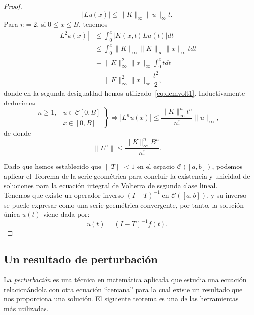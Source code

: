 \begin{proof}
\begin{equation}
		|Lu(x)| \leqslant \lVert K \rVert_\infty \lVert u \rVert_\infty t.
	\end{equation}
	Para $n = 2$, si $0 \leqslant x \leqslant B$, tenemos
	\begin{equation}
		\begin{split}
			|L^2u(x)| & \leqslant \int_{0}^{x}|K(x,t)Lu(t)|dt \\
			& \leqslant \int_{0}^{x} \lVert K \rVert_\infty \lVert K \rVert_\infty \lVert x \rVert_\infty tdt\\
			& =  \lVert K \rVert_\infty^2 \lVert x \rVert_\infty \int_{0}^{x}tdt \\
			& = \lVert K \rVert_\infty^2 \lVert x \rVert_\infty \dfrac{t^2}{2},
		\end{split}
	\end{equation}
	donde en la segunda desigualdad hemos utilizado~\eqref{eq:demvolt1}. Inductivamente deducimos
	\begin{equation}
		\left.\begin{split}
			n \geqslant 1, & u \in \mathcal{C}[0,B]\\
			& x \in [0,B]
		\end{split}\right\rbrace \Rightarrow |L^nu(x)| \leqslant \dfrac{\lVert K \rVert_\infty^nt^n}{n!}\lVert u \rVert_\infty,
	\end{equation}
	de donde
	\begin{equation}\label{eq:demvolt2}
		\lVert L^n \rVert \leqslant \dfrac{\lVert K \rVert_\infty^nB^n}{n!}.
	\end{equation}

	Dado que hemos establecido que $\lVert T \rVert < 1$ en el espacio $\mathcal{C}([a,b])$, podemos aplicar el Teorema de la serie geométrica para concluir la existencia y unicidad de soluciones para la ecuación integral de Volterra de segunda clase lineal.\\
	Tenemos que existe un operador inverso $(I-T)^{-1}$ en $\mathcal{C}([a,b])$, y su inverso se puede expresar como una serie geométrica convergente, por tanto,  la solución única $u(t)$ viene dada por:
	\begin{equation}
		u(t) = (I-T)^{-1}f(t).
	\end{equation}
\end{proof}
\subsection{Un resultado de perturbación}
La \textit{perturbación} es una técnica en matemática aplicada que estudia una ecuación relacionándola con otra ecuación ``cercana'' para la cual existe un resultado que nos proporciona una solución. El siguiente teorema es una de las herramientas más utilizadas.

